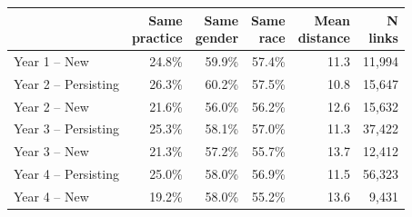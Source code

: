 
\begin{tabular}{lrrrrr}
\toprule
  & \shortstack[r]{Same \\ practice} & \shortstack[r]{Same \\ gender} & \shortstack[r]{Same \\ race} & \shortstack[r]{Mean \\ distance} & \shortstack[r]{N \\ links}\\
\midrule
Year 1 -- New & 24.8\% & 59.9\% & 57.4\% & 11.3 & 11,994\\
Year 2 -- Persisting & 26.3\% & 60.2\% & 57.5\% & 10.8 & 15,647\\
Year 2 -- New & 21.6\% & 56.0\% & 56.2\% & 12.6 & 15,632\\
Year 3 -- Persisting & 25.3\% & 58.1\% & 57.0\% & 11.3 & 37,422\\
Year 3 -- New & 21.3\% & 57.2\% & 55.7\% & 13.7 & 12,412\\
Year 4 -- Persisting & 25.0\% & 58.0\% & 56.9\% & 11.5 & 56,323\\
Year 4 -- New & 19.2\% & 58.0\% & 55.2\% & 13.6 & 9,431\\
\bottomrule
\end{tabular}
